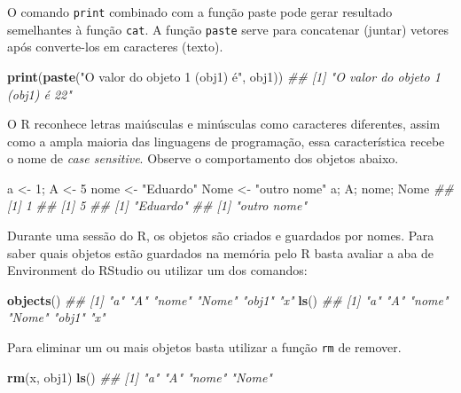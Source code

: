 \documentclass[
  11pt,
  a5paper,
  openany]{book}
\newenvironment{Shaded}{\begin{snugshade}}{\end{snugshade}}
\newcommand{\CommentTok}[1]{\textcolor[rgb]{0.56,0.35,0.01}{\textit{#1}}}
\newcommand{\DecValTok}[1]{\textcolor[rgb]{0.00,0.00,0.81}{#1}}
\newcommand{\KeywordTok}[1]{\textcolor[rgb]{0.13,0.29,0.53}{\textbf{#1}}}
\newcommand{\NormalTok}[1]{#1}
\newcommand{\StringTok}[1]{\textcolor[rgb]{0.31,0.60,0.02}{#1}}
\begin{document}
O comando \texttt{print} combinado com a função paste pode gerar resultado semelhantes à função \texttt{cat}. A função \texttt{paste} serve para concatenar (juntar) vetores após converte-los em caracteres (texto).

\begin{Shaded}
\begin{Highlighting}[]
\KeywordTok{print}\NormalTok{(}\KeywordTok{paste}\NormalTok{(}\StringTok{"O valor do objeto 1 (obj1) é"}\NormalTok{, obj1))}
\CommentTok{## [1] "O valor do objeto 1 (obj1) é 22"}
\end{Highlighting}
\end{Shaded}

O R reconhece letras maiúsculas e minúsculas como caracteres diferentes, assim como a ampla maioria das linguagens de programação, essa característica recebe o nome de \emph{case sensitive}. Observe o comportamento dos objetos abaixo.

\begin{Shaded}
\begin{Highlighting}[]
\NormalTok{a <-}\StringTok{ }\DecValTok{1}\NormalTok{; A <-}\StringTok{ }\DecValTok{5}
\NormalTok{nome <-}\StringTok{ "Eduardo"}
\NormalTok{Nome <-}\StringTok{ "outro nome"}
\NormalTok{a; A; nome; Nome}
\CommentTok{## [1] 1}
\CommentTok{## [1] 5}
\CommentTok{## [1] "Eduardo"}
\CommentTok{## [1] "outro nome"}
\end{Highlighting}
\end{Shaded}

Durante uma sessão do R, os objetos são criados e guardados por nomes. Para saber quais objetos estão guardados na memória pelo R basta avaliar a aba de Environment do RStudio ou utilizar um dos comandos:

\begin{Shaded}
\begin{Highlighting}[]
\KeywordTok{objects}\NormalTok{()}
\CommentTok{## [1] "a" "A" "nome" "Nome" "obj1" "x"   }
\KeywordTok{ls}\NormalTok{()}
\CommentTok{## [1] "a" "A" "nome" "Nome" "obj1" "x"   }
\end{Highlighting}
\end{Shaded}

Para eliminar um ou mais objetos basta utilizar a função \texttt{rm} de remover.

\begin{Shaded}
\begin{Highlighting}[]
\KeywordTok{rm}\NormalTok{(x, obj1)}
\KeywordTok{ls}\NormalTok{()}
\CommentTok{## [1] "a" "A" "nome" "Nome"}
\end{Highlighting}
\end{Shaded}
\end{document}
